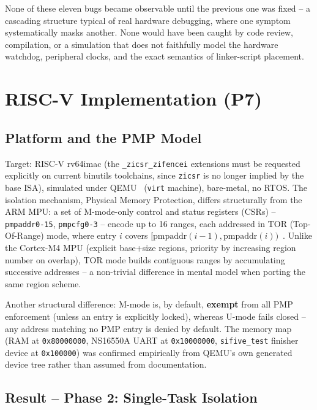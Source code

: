 \documentclass[sigconf,nonacm]{acmart}
\begin{document}
None of these eleven bugs became observable until the previous one was fixed -- a cascading structure typical of real hardware debugging, where one symptom systematically masks another. None would have been caught by code review, compilation, or a simulation that does not faithfully model the hardware watchdog, peripheral clocks, and the exact semantics of linker-script placement.

\section{RISC-V Implementation (P7)}
\label{sec:p7}

\subsection{Platform and the PMP Model}

Target: RISC-V rv64imac (the \texttt{\_zicsr\_zifencei} extensions must be requested explicitly on current binutils toolchains, since \texttt{zicsr} is no longer implied by the base ISA), simulated under QEMU~\cite{bellard2005qemu} (\texttt{virt} machine), bare-metal, no RTOS. The isolation mechanism, Physical Memory Protection, differs structurally from the ARM MPU: a set of M-mode-only control and status registers (CSRs) -- \texttt{pmpaddr0-15}, \texttt{pmpcfg0-3} -- encode up to 16 ranges, each addressed in TOR (Top-Of-Range) mode, where entry $i$ covers $[\text{pmpaddr}(i-1), \text{pmpaddr}(i))$~\cite{riscv-priv}. Unlike the Cortex-M4 MPU (explicit base+size regions, priority by increasing region number on overlap), TOR mode builds contiguous ranges by accumulating successive addresses -- a non-trivial difference in mental model when porting the same region scheme.

Another structural difference: M-mode is, by default, \textbf{exempt} from all PMP enforcement (unless an entry is explicitly locked), whereas U-mode fails closed -- any address matching no PMP entry is denied by default. The memory map (RAM at \texttt{0x80000000}, NS16550A UART at \texttt{0x10000000}, \texttt{sifive\_test} finisher device at \texttt{0x100000}) was confirmed empirically from QEMU's own generated device tree rather than assumed from documentation.

\subsection{Result -- Phase 2: Single-Task Isolation}
\label{sec:p7-phase2}
\end{document}
